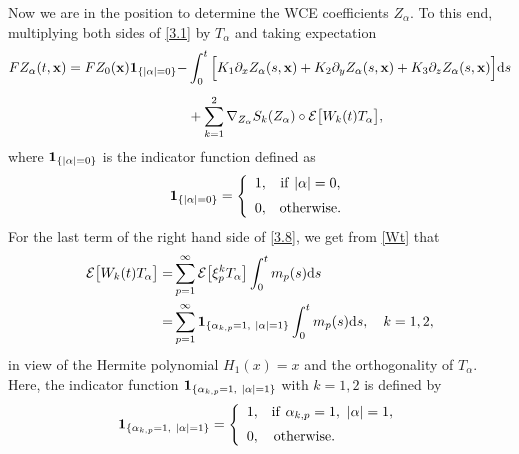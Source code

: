 \documentclass[preprint,12pt]{article}
\numberwithin{figure}{section}
\numberwithin{table}{section}
\numberwithin{equation}{section}
\begin{document}
Now we are in the position to determine the WCE coefficients $Z_\alpha$. To this end, multiplying both sides of \eqref{3.1} by $T_{\alpha}$ and taking expectation
\begin{equation}\label{3.8}
\begin{split}
   FZ_{\alpha}(t,{\bf x})=FZ_0({\bf x}){\bf 1}_{\{|\alpha|=0\}}-&\int_{0}^{t}\Big[K_1\partial_xZ_{\alpha}(s,{\bf x})+K_2\partial_yZ_{\alpha}(s,{\bf x})+K_3\partial_zZ_{\alpha}(s,{\bf x})\Big]{\rm d}s\\[1.5mm]
   &+\sum_{k=1}^2\nabla_{Z_{\alpha}} S_{k}(Z_{\alpha})\circ\mathcal{E}\big[W_{k}(t)T_{\alpha}\big],
  \end{split}
\end{equation}
where ${\bf 1}_{\{|\alpha|=0\}}$ is the indicator function defined as
\begin{align*}
 {\bf 1}_{\{|\alpha|=0\}}=
  \left\{
\begin{array}{cc}
1,&\mathrm{if}~|\alpha|=0,\\[2mm]
0,&\mathrm{otherwise}.
\end{array}\right.
\end{align*}
For the last term of the right hand side of \eqref{3.8}, we get from \eqref{Wt} that
\begin{equation}\label{3.9}
	\begin{split}
\mathcal{E}\big[W_{k}(t)T_\alpha\big]=&\sum_{p=1}^{\infty}\mathcal{E}\big[\xi_{p}^{k}T_{\alpha}\big]\int_{0}^{t}m_{p}(s){\rm d}s\\
=&\sum_{p=1}^{\infty}{\bf 1}_{\{\alpha_{k,p}=1,~|\alpha|=1\}}\int_{0}^{t}m_p(s){\rm d}s,\quad k=1,2,
\end{split}
\end{equation}
in view of the Hermite polynomial $H_{1}(x)=x$ and the orthogonality of $T_{\alpha}$. Here, the indicator function ${\bf 1}_{\{\alpha_{k,p}=1,~|\alpha|=1\}}$ with $k=1,2$ is defined by
\begin{align*}
{\bf 1}_{\{\alpha_{k,p}=1,~|\alpha|=1\}}=
	\left\{
	\begin{array}{cc}
		1,&\mathrm{if}~\alpha_{k,p}=1,~|\alpha|=1,\\[2mm]
		0,&\mathrm{otherwise}.~~~~~~~~~~~~
	\end{array}\right. 
\end{align*}
\end{document}
